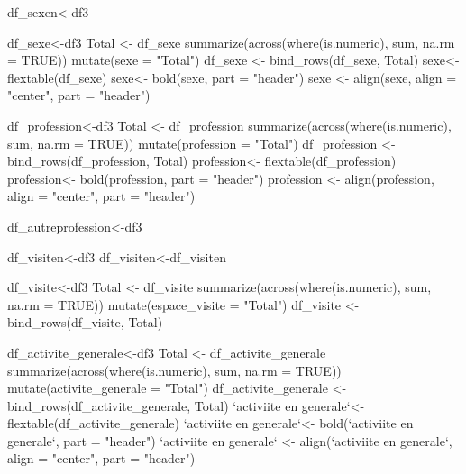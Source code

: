 df_sexen<-df3%


df_sexe<-df3%
Total <- df_sexe %
  summarize(across(where(is.numeric), sum, na.rm = TRUE)) %
  mutate(sexe = "Total")
df_sexe <- bind_rows(df_sexe, Total)
sexe<- flextable(df_sexe)
sexe<- bold(sexe, part = "header")
sexe <- align(sexe, align = "center", part = "header")






df_profession<-df3%
Total <- df_profession %
  summarize(across(where(is.numeric), sum, na.rm = TRUE)) %
  mutate(profession = "Total")
df_profession <- bind_rows(df_profession, Total)
profession<- flextable(df_profession)
profession<- bold(profession, part = "header")
profession <- align(profession, align = "center", part = "header")






df_autreprofession<-df3%

df_visiten<-df3%
df_visiten<-df_visiten%

df_visite<-df3%
Total <- df_visite %
  summarize(across(where(is.numeric), sum, na.rm = TRUE)) %
  mutate(espace_visite = "Total")
df_visite <- bind_rows(df_visite, Total)





df_activite_generale<-df3%
Total <- df_activite_generale %
  summarize(across(where(is.numeric), sum, na.rm = TRUE)) %
  mutate(activite_generale = "Total")
df_activite_generale <- bind_rows(df_activite_generale, Total)
`activiite en generale`<- flextable(df_activite_generale)
`activiite en generale`<- bold(`activiite en generale`, part = "header")
`activiite en generale` <- align(`activiite en generale`, align = "center", part = "header")






